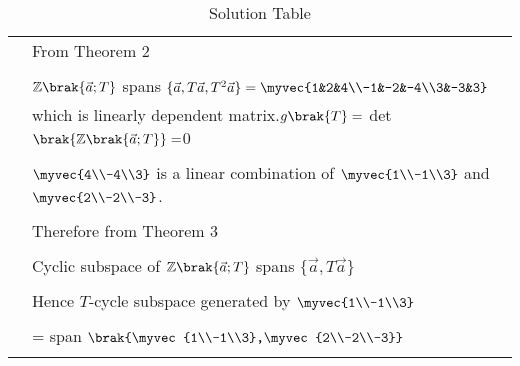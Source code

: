 \begin{longtable}{|l|l|}
&From Theorem 2\\
&\\
&$\mathbb{Z}\brak{\vec{a};T}$ spans $\{\vec{a},T\vec{a},T^2\vec{a}\}=\myvec{1&2&4\\-1&-2&-4\\3&-3&3}$\\
&which is linearly dependent matrix.$g\brak{T}=$ det$\brak{\mathbb{Z}\brak{\vec{a};T}}=$0\\
&\\
&$\myvec{4\\-4\\3}$ is a linear combination of $\myvec{1\\-1\\3}$ and $\myvec{2\\-2\\-3}$.\\
&\\
& Therefore from Theorem 3\\
&\\
&Cyclic subspace of $\mathbb{Z}\brak{\vec{a};T}$ spans $\{\vec{a} , T\vec{a}\}$\\
&\\
&Hence $T$-cycle subspace generated by $\myvec{1\\-1\\3}$\\
&\\
&= span $\brak{\myvec{1\\-1\\3},\myvec{2\\-2\\-3}}$ \\

\hline

\caption{Solution Table}
\label{eq:solutions/7/1/2/table:2}
\end{longtable}

\twocolumn

